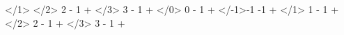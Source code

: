 \par\noindent \CurrentFile
\mySection</1>{         \myRLTVBaseExpected}
\mySection</2>{ 2 - 1 + \myRLTVBaseExpected}
\mySection</3>{ 3 - 1 + \myRLTVBaseExpected}
\mySection</0>{ 0 - 1 + \myRLTVBaseExpected}
\mySection</-1>{-1 -1 + \myRLTVBaseExpected}
\mySection</1>{ 1 - 1 + \RLTVBase}
\mySection</2>{ 2 - 1 + \RLTVBase}
\mySection</3>{ 3 - 1 + \RLTVBase}
